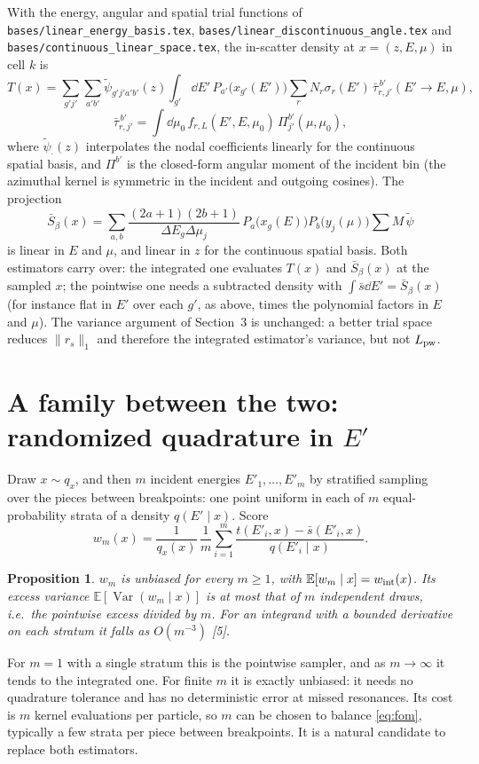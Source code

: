 \documentclass[11pt]{article}
\newtheorem{proposition}{Proposition}
\newcommand{\tpsi}{\tilde\psi}
\newcommand{\Sbar}{\bar S}
\newcommand{\E}{\mathbb{E}}
\newcommand{\Var}{\operatorname{Var}}
\begin{document}
With the energy, angular and spatial trial functions of \texttt{bases/linear\_energy\_basis.tex},
\texttt{bases/linear\_discontinuous\_angle.tex} and \texttt{bases/continuous\_linear\_space.tex},
the in-scatter density at $x=(z,E,\mu)$ in cell $k$ is
\begin{equation}
  T(x) = \sum_{g'j'}\sum_{a'b'} \tpsi_{g'j'a'b'}(z)\int_{g'}\dd E'\,
  P_{a'}\big(x_{g'}(E')\big) \sum_r N_r\sigma_r(E')\,
  \bar\tau^{\,b'}_{r,j'}(E'\to E,\mu),
\end{equation}
\begin{equation}
  \bar\tau^{\,b'}_{r,j'} = \int\dd\mu_0\, f_{r,L}(E',E,\mu_0)\,
  \Pi^{b'}_{j'}(\mu,\mu_0),
\end{equation}
where $\tpsi_{\cdot}(z)$ interpolates the nodal coefficients linearly for the
continuous spatial basis, and $\Pi^{b'}$ is the closed-form angular moment of the
incident bin (the azimuthal kernel is symmetric in the incident and outgoing cosines).
The projection
\[
  \Sbar_\beta(x) = \sum_{a,b}\frac{(2a+1)(2b+1)}{\Delta E_g\Delta\mu_j}\,
  P_a\big(x_g(E)\big)P_b\big(y_j(\mu)\big)\sum M\,\tpsi
\]
is linear in $E$ and $\mu$, and linear in $z$ for the continuous spatial basis.
Both estimators carry over: the integrated one evaluates $T(x)$ and $\Sbar_\beta(x)$ at
the sampled $x$; the pointwise one needs a subtracted density with
$\int\bar s\dd E' = \Sbar_\beta(x)$ (for instance flat in $E'$ over each $g'$, as
above, times the polynomial factors in $E$ and $\mu$). The variance argument of
Section~3 is unchanged: a better trial space reduces $\|r_s\|_1$ and therefore the
integrated estimator's variance, but not $L_{\rm pw}$.

\section{A family between the two: randomized quadrature in $E'$}

Draw $x\sim q_x$, and then $m$ incident energies $E'_1,\dots,E'_m$ by stratified
sampling over the pieces between breakpoints: one point uniform in each of $m$
equal-probability strata of a density $q(E'\mid x)$. Score
\begin{equation}
  w_m(x) = \frac{1}{q_x(x)}\,\frac{1}{m}\sum_{i=1}^m
  \frac{t(E'_i,x) - \bar s(E'_i,x)}{q(E'_i\mid x)} .
\end{equation}
\begin{proposition}
$w_m$ is unbiased for every $m\ge 1$, with $\E[w_m\mid x] = w_{\rm int}(x)$. Its excess
variance $\E[\Var(w_m\mid x)]$ is at most that of $m$ independent draws, i.e.\ the
pointwise excess divided by $m$. For an integrand with a bounded derivative on each
stratum it falls as $O(m^{-3})$ [5].
\end{proposition}
\noindent For $m=1$ with a single stratum this is the pointwise sampler, and as
$m\to\infty$ it tends to the integrated one. For finite $m$ it is exactly unbiased: it
needs no quadrature tolerance and has no deterministic error at missed resonances.
Its cost is $m$ kernel evaluations per particle, so $m$ can be chosen to balance
\eqref{eq:fom}, typically a few strata per piece between breakpoints. It is a natural
candidate to replace both estimators.
\end{document}
